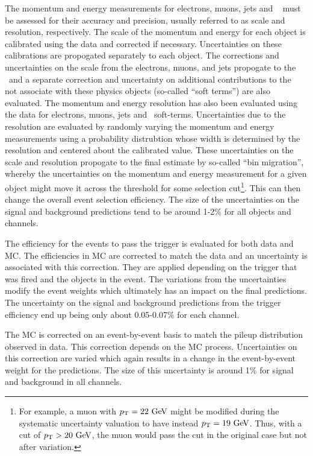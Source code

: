 The momentum and energy measurements for electrons, muons, jets and \MET~
must be assessed for their accuracy and precision, usually referred to
as scale and resolution, respectively. The scale of the momentum and energy 
for each object is calibrated using the data and corrected if necessary.
Uncertainties on these calibrations are propogated separately to each object.
The corrections and uncertainties on the scale
from the electrons, muons, and jets propogate to the \MET~and a separate
correction and uncertainty on additional contributions to the \MET~
not associate with these physics objects (so-called ``soft terms'')
are also evaluated. 
The momentum and energy resolution has also been evaluated using the data
for electrons, muons, jets and \MET~soft-terms.  Uncertainties due to the
resolution are evaluated by randomly varying the momentum and energy measurements
using a probability distrubtion whose width is determined by the resolution
and centered about the calibrated value. These uncertainties on the scale
and resolution propogate to the final estimate by so-called ``bin migration'',
whereby the uncertainties on the momentum and energy measurement 
for a given object might move it across the threshold for some 
selection cut\footnote{For example, a muon with $\pt = 22 \GeV$ might
be modified during the systematic uncertainty valuation to have instead
$\pt = 19 \GeV$. Thus, with a cut of $\pt > 20 \GeV$, the muon would pass the
cut in the original case but not after variation.}. This can 
then change the overall event selection efficiency. The size of the uncertainties
on the signal and background predictions tend to be around 1-2\% for
all objects and channels.


The efficiency for the events to pass the trigger is evaluated for both 
data and MC.  The efficiencies in MC are corrected to match the data
and an uncertainty is associated with this correction.  They are applied
depending on the trigger that was fired and the objects in the event.
The variations from the uncertainties
modify the event weights which ultimately has an impact on the final predictions.
The uncertainty on the signal and background predictions from the trigger
efficiency end up being only about 0.05-0.07\%  for each channel.

The MC is corrected on an event-by-event basis to match the 
pileup distribution observed in data. This correction depends on the 
MC process. Uncertainties on this correction are varied which again
results in a change in the event-by-event weight for the predictions. The
size of this uncertainty is around 1\% for signal and background in all channels.


